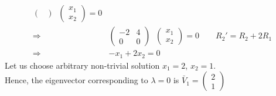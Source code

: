 \documentclass[../main-sheet.tex]{subfiles}
\begin{document}
\begin{soln}
\begin{align*}
\begin{pmatrix}
        \end{pmatrix}\;\;\begin{pmatrix}
            x_1\\
            x_2
        \end{pmatrix}=0\\
        \Rightarrow\;\;&\begin{pmatrix}
            -2&4\\
            0&0
        \end{pmatrix}\;\;\begin{pmatrix}
            x_1\\
            x_2
        \end{pmatrix}=0\qquad R_2'=R_2+2R_1\\
        \Rightarrow\;\;&-x_1+2x_2=0
    \end{align*}
    Let us choose arbitrary non-trivial solution \(x_1=2\), \(x_2=1\).\\
    Hence, the eigenvector corresponding to \(\lambda=0\) is \(\displaystyle \bar{V}_1=\begin{pmatrix}
        2\\
        1
    \end{pmatrix}\)\\


\end{soln}
\end{document}
